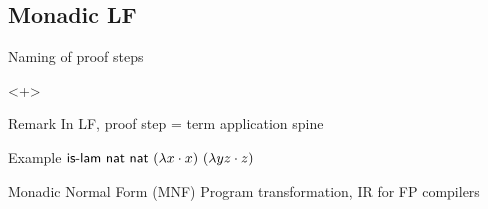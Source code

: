 \documentclass[ignorenonframetext,red]{beamer}
\begin{document}
\subsection{Monadic LF}

\begin{frame}{Naming of proof steps}
  \begin{onlyenv}<+>
    \begin{block}{Remark}
      In LF, proof step = term application spine

      \textcolor{green!50!black}{Example} $ \text{\textsf{is-lam}}\
      \mathsf{nat}\ \mathsf{nat}\ (\lambda{x}\cdot x)\ (\lambda{y z}\cdot z) $
    \end{block}

    \begin{block}{Monadic Normal Form (\textsf{MNF})}
      Program transformation, IR for FP compilers


\end{block}
\end{onlyenv}
\end{frame}
\end{document}
